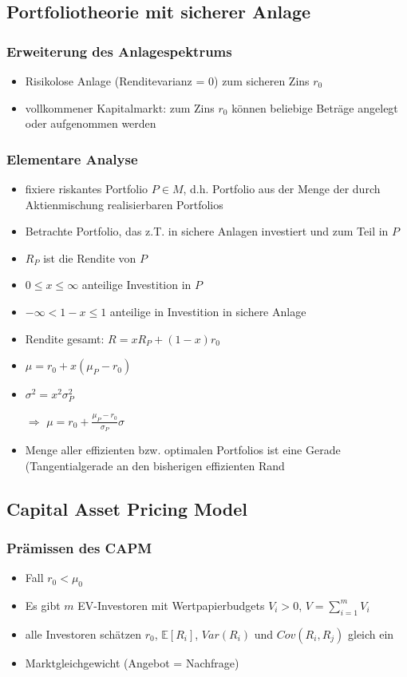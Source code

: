 \documentclass[12pt]{report}
\theoremstyle{dotless}
\theoremstyle{definition}
\begin{document}
\subsection{Portfoliotheorie mit sicherer Anlage}

\subsubsection{Erweiterung des Anlagespektrums}
\begin{itemize}
	\item Risikolose Anlage (Renditevarianz = 0) zum sicheren Zins $r_0$
	\item vollkommener Kapitalmarkt: zum Zins $r_0$ k\"onnen beliebige Betr\"age angelegt oder aufgenommen werden
\end{itemize}

\subsubsection{Elementare Analyse}
\begin{itemize}
	\item fixiere riskantes Portfolio $P \in M$, d.h. Portfolio aus der Menge der durch Aktienmischung realisierbaren Portfolios
	\item Betrachte Portfolio, das z.T. in sichere Anlagen investiert und zum Teil in $P$
	\item $R_P$ ist die Rendite von $P$
	\item $0 \leq x \leq \infty$ anteilige Investition in $P$
	\item $-\infty < 1-x \leq 1$ anteilige in Investition in sichere Anlage
	\item Rendite gesamt: $R=xR_P + (1-x)r_0$
	\item $\mu = r_0+x(\mu_P - r_0)$
	\item $\sigma^2 = x^2 \sigma_P^2$
	\item[$\Rightarrow$] $\mu = r_0 + \frac{\mu_P-r_0}{\sigma_P}\sigma$
	\item Menge aller effizienten bzw. optimalen Portfolios ist eine Gerade (Tangentialgerade an den bisherigen effizienten Rand 
\end{itemize}

\subsection{Capital Asset Pricing Model}

\subsubsection{Pr\"amissen des CAPM}
\begin{itemize}
	\item Fall $r_0 < \mu_0$
	\item Es gibt $m$ EV-Investoren mit Wertpapierbudgets $V_i >0$, $V = \sum_{i=1}^m V_i$
	\item alle Investoren sch\"atzen $r_0$, $\mathbb{E}[R_i]$, $Var(R_i)$ und $Cov(R_i,R_j)$ gleich ein
	\item Marktgleichgewicht (Angebot = Nachfrage)
\end{itemize}
\end{document}
